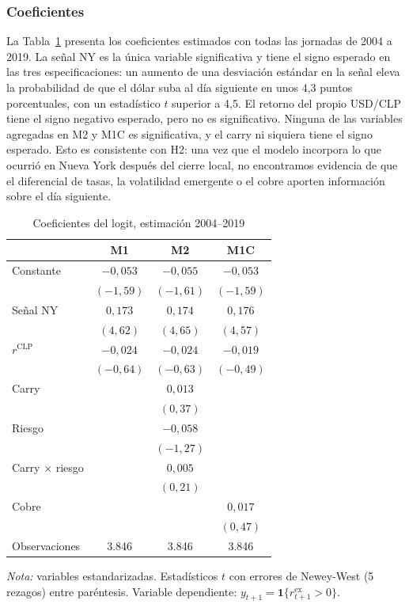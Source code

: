 \documentclass[11pt,a4paper]{article}
\newcommand{\rex}{r^{\text{ex}}}
\begin{document}
\subsubsection{Coeficientes}
La Tabla~\ref{tab:coef} presenta los coeficientes estimados con todas las jornadas de 2004 a 2019. La señal NY es la única variable significativa y tiene el signo esperado en las tres especificaciones: un aumento de una desviación estándar en la señal eleva la probabilidad de que el dólar suba al día siguiente en unos 4,3 puntos porcentuales, con un estadístico \(t\) superior a 4,5. El retorno del propio USD/CLP tiene el signo negativo esperado, pero no es significativo. Ninguna de las variables agregadas en M2 y M1C es significativa, y el carry ni siquiera tiene el signo esperado. Esto es consistente con H2: una vez que el modelo incorpora lo que ocurrió en Nueva York después del cierre local, no encontramos evidencia de que el diferencial de tasas, la volatilidad emergente o el cobre aporten información sobre el día siguiente.

\begin{table}[htbp]\centering
\caption{Coeficientes del logit, estimación 2004--2019}\label{tab:coef}
\begin{threeparttable}
\begin{tabular}{l ccc}
\toprule
 & M1 & M2 & M1C \\
\midrule
Constante & $-0{,}053$ & $-0{,}055$ & $-0{,}053$ \\
 & $(-1{,}59)$ & $(-1{,}61)$ & $(-1{,}59)$ \\
Señal NY & $0{,}173$ & $0{,}174$ & $0{,}176$ \\
 & $(4{,}62)$ & $(4{,}65)$ & $(4{,}57)$ \\
$r^{\text{CLP}}$ & $-0{,}024$ & $-0{,}024$ & $-0{,}019$ \\
 & $(-0{,}64)$ & $(-0{,}63)$ & $(-0{,}49)$ \\
Carry & & $0{,}013$ & \\
 & & $(0{,}37)$ & \\
Riesgo & & $-0{,}058$ & \\
 & & $(-1{,}27)$ & \\
Carry $\times$ riesgo & & $0{,}005$ & \\
 & & $(0{,}21)$ & \\
Cobre & & & $0{,}017$ \\
 & & & $(0{,}47)$ \\
\midrule
Observaciones & 3.846 & 3.846 & 3.846 \\
\bottomrule
\end{tabular}
\begin{tablenotes}\footnotesize
\item \emph{Nota:} variables estandarizadas. Estadísticos \(t\) con errores de Newey-West (5 rezagos) entre paréntesis. Variable dependiente: \(y_{t+1}=\mathbf{1}\{\rex_{t+1}>0\}\).
\end{tablenotes}
\end{threeparttable}
\end{table}
\end{document}
